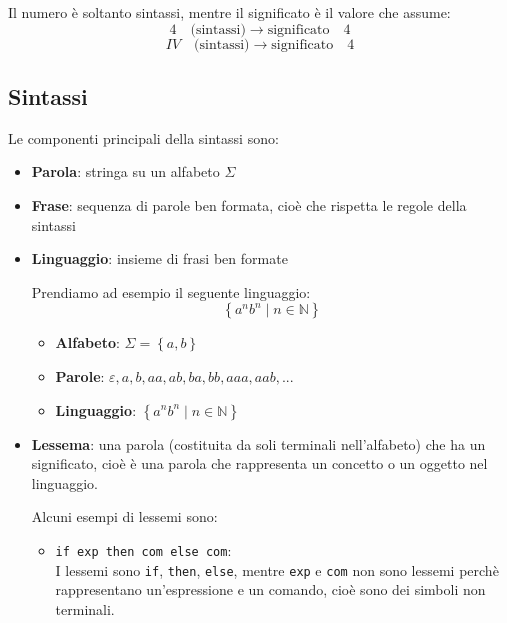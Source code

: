 \documentclass[a4paper]{article}
\begin{document}
\begin{example}
  Il numero è soltanto sintassi, mentre il significato è il valore che assume:
  \[
    4 \quad \text{(sintassi)} \to \text{significato} \quad 4
  \] 
  \[
    IV \quad \text{(sintassi)} \to  \text{significato} \quad 4
  \] 
\end{example}

\subsection{Sintassi}
Le componenti principali della sintassi sono:
\begin{itemize}
  \item \textbf{Parola}: stringa su un alfabeto \( \Sigma \)

  \item \textbf{Frase}: sequenza di parole ben formata, cioè che rispetta le regole
    della sintassi

  \item \textbf{Linguaggio}: insieme di frasi ben formate

    \begin{example}
      Prendiamo ad esempio il seguente linguaggio:
      \[
        \left\{ a^n b^n \;\left|\; n \in \mathbb{N} \right. \right\}
      \] 
      \begin{itemize}
        \item \textbf{Alfabeto}: \( \Sigma = \left\{ a, b \right\} \) 
        \item \textbf{Parole}: \( \varepsilon, a, b, aa, ab, ba, bb, aaa, aab, ... \)
        \item \textbf{Linguaggio}: \(
          \left\{ a^n b^n \;\left|\; n \in \mathbb{N} \right. \right\}
        \)
      \end{itemize}
    \end{example}

  \item \textbf{Lessema}: una parola (costituita da soli terminali nell'alfabeto) che
  ha un significato, cioè è una parola che rappresenta un concetto o un oggetto nel
  linguaggio.

  \begin{example}
    Alcuni esempi di lessemi sono:
    \begin{itemize}
      \item \texttt{if exp then com else com}:\\
        I lessemi sono \texttt{if}, \texttt{then}, \texttt{else}, mentre \texttt{exp}
        e \texttt{com} non sono lessemi perchè rappresentano un'espressione e un comando,
        cioè sono dei simboli non terminali.
    \end{itemize}
  \end{example}


\end{itemize}
\end{document}
